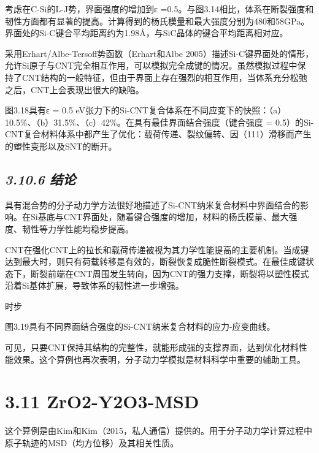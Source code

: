 考虑在C-Si的L-J势，界面强度的增加到ε
=0.5。与图3.14相比，体系在断裂强度和韧性方面都有显著的提高。计算得到的杨氏模量和最大强度分别为480和58GPa。界面处的Si-C键合平均距离约为1.98Å，与SiC晶体的键合平均距离相对应。

采用Erhart/Albe-Tersoff势函数（Erhart和Albe
2005）描述Si-C键界面处的情形，允许Si原子与CNT完全相互作用，可以模拟完全成键的情况。虽然模拟过程中保持了CNT结构的一般特征，但由于界面上存在强烈的相互作用，当体系充分松弛之后，CNT上会表现出很大的缺陷。


图3.18具有ε = 0.5
eV张力下的Si-CNT复合体系在不同应变下的快照：（a）10.5\%、（b）31.5\%、（c）42\%。在具有最佳界面结合强度（键合强度
=
0.5）的Si-CNT复合材料体系中都产生了优化：载荷传递、裂纹偏转、因（111）滑移而产生的塑性变形以及SNT的断开。

\hypertarget{ux7ed3ux8bba-2}{%
\subsection{\texorpdfstring{\emph{3.10.6
结论}}{3.10.6 结论}}\label{ux7ed3ux8bba-2}}

具有混合势的分子动力学方法很好地描述了Si-CNT纳米复合材料中界面结合的影响。在Si基底与CNT界面处，随着键合强度的增加，材料的杨氏模量、最大强度、韧性等力学性能均稳步提高。

CNT在强化CNT上的拉长和载荷传递被视为其力学性能提高的主要机制。当成键达到最大时，则只有荷载转移是有效的，断裂恢复成脆性断裂模式。在最佳成键状态下，断裂前端在CNT周围发生转向，因为CNT的强力支撑，断裂将以塑性模式沿着Si基体扩展，导致体系的韧性进一步增强。


时步

图3.19具有不同界面结合强度的Si-CNT纳米复合材料的应力-应变曲线。

可见，只要CNT保持其结构的完整性，就能形成强的支撑界面，达到优化材料性能效果。这个算例也再次表明，分子动力学模拟是材料科学中重要的辅助工具。

\hypertarget{zro2-y2o3-msd}{%
\section{3.11 ZrO2-Y2O3-MSD}\label{zro2-y2o3-msd}}

这个算例是由Kim和Kim（2015，私人通信）提供的。用于分子动力学计算过程中原子轨迹的MSD（均方位移）及其相关性质。

